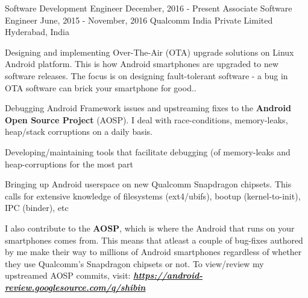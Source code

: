 

\begin{cvtwoposentries}

  \cvtwoposentry
    {Software Development Engineer} %
    {December, 2016 - Present} %
    {Associate Software Engineer}
    {June, 2015 - November, 2016}
    {Qualcomm India Private Limited} %
    {Hyderabad, India} %
    {
      \begin{cvitems} %
        \item {Designing and implementing Over-The-Air (OTA) upgrade solutions on Linux Android platform. This is how Android smartphones are upgraded to new software releases. \newline
        The focus is on designing fault-tolerant software - a bug in OTA software can brick your smartphone for good..}
        \item {Debugging Android Framework issues and upstreaming fixes to the \textbf{Android Open Source Project} (AOSP). I deal with race-conditions, memory-leaks, heap/stack corruptions on a daily basis.}
        \item {Developing/maintaining tools that facilitate debugging (of memory-leaks and heap-corruptions for the most part}
        \item {Bringing up Android userspace on new Qualcomm Snapdragon chipsets. This calls for extensive knowledge of filesystems (ext4/ubifs), bootup (kernel-to-init), IPC (binder), etc}
        \item {I also contribute to the \textbf{AOSP}, which is where the Android that runs on your smartphones comes from. This means that atleast a couple of bug-fixes authored by me make their way to millions of Android smartphones regardless of whether they use Qualcomm's Snapdragon chipsets or not. \newline
        To view/review my upstreamed AOSP commits, visit: \textit{\textbf{\url{https://android-review.googlesource.com/q/shibin}}}}
      \end{cvitems}
    }

  
\end{cvtwoposentries}

